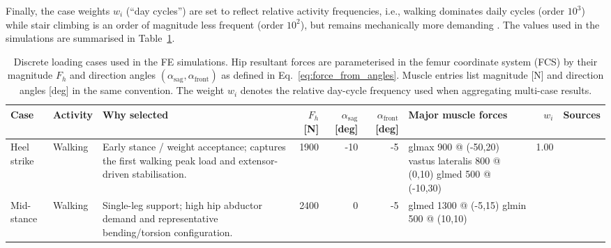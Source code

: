 Finally, the case weights $w_i$ (``day cycles'') are set to reflect relative activity frequencies, i.e., walking dominates daily cycles (order $10^3$) while stair climbing is an order of magnitude less frequent (order $10^2$), but remains mechanically more demanding \cite{Bergmann2016_StandardizedLoadsHipImplants}.
The values used in the simulations are summarised in Table~\ref{tab:loading_cases}.

\begin{table}[!htbp]
\centering
\footnotesize
\setlength{\tabcolsep}{4pt}
\renewcommand{\arraystretch}{1.2}
\caption{Discrete loading cases used in the FE simulations. Hip resultant forces are parameterised in the femur coordinate system (FCS) by their magnitude $F_h$ and direction angles $(\alpha_{\mathrm{sag}},\alpha_{\mathrm{front}})$ as defined in Eq.~\eqref{eq:force_from_angles}. Muscle entries list magnitude [N] and direction angles [deg] in the same convention. The weight $w_i$ denotes the relative day-cycle frequency used when aggregating multi-case results. }
\label{tab:loading_cases}
\begin{tabularx}{\textwidth}{@{} l l >{\raggedright\arraybackslash}X r r r >{\raggedright\arraybackslash}X r l @{}}
\toprule
Case & Activity & Why selected & $F_h$ [N] & $\alpha_{\mathrm{sag}}$ [deg] & $\alpha_{\mathrm{front}}$ [deg] & Major muscle forces & $w_i$ & Sources \\
\midrule
Heel strike & Walking & Early stance / weight acceptance; captures the first walking peak load and extensor-driven stabilisation. & 1900 & -10 & -5 &
glmax 900 @ (-50,20)\newline
vastus lateralis 800 @ (0,10)\newline
glmed 500 @ (-10,30)
& 1.00 & \cite{Bergmann2010_RealisticLoadsHipImplants,Bergmann2016_StandardizedLoadsHipImplants} \\
Mid-stance & Walking & Single-leg support; high hip abductor demand and representative bending/torsion configuration. & 2400 & 0 & -5 &
glmed 1300 @ (-5,15)\newline
glmin 500 @ (10,10)\newline

\end{tabularx}
\end{table}
